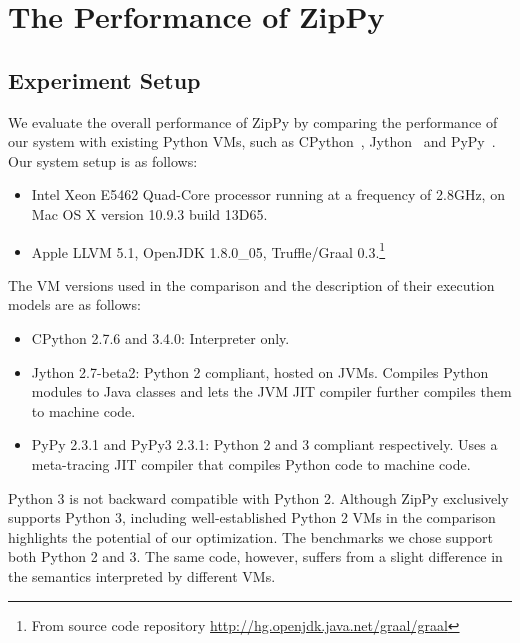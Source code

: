 \section{The Performance of ZipPy}
\label{sec:eval-performance-of-zippy}

\subsection{Experiment Setup}

We evaluate the overall performance of ZipPy by comparing the performance of our system with existing Python VMs, such as CPython~\cite{python}, Jython~\cite{jython} and PyPy~\cite{pypy}.
Our system setup is as follows:

\begin{itemize}

\item Intel Xeon E5462 Quad-Core processor running at a frequency of 2.8GHz, on Mac OS X version 10.9.3 build 13D65.

\item Apple LLVM 5.1, OpenJDK 1.8.0\_05, Truffle/Graal 0.3.\footnote{From source code repository \url{http://hg.openjdk.java.net/graal/graal}}

\end{itemize}

The VM versions used in the comparison and the description of their execution models are as follows:

\begin{itemize}

\item CPython 2.7.6 and 3.4.0: Interpreter only.

\item Jython 2.7-beta2:
Python 2 compliant, hosted on JVMs.
Compiles Python modules to Java classes and lets the JVM JIT compiler further compiles them to machine code.

\item PyPy 2.3.1 and PyPy3 2.3.1: Python 2 and 3 compliant respectively.
Uses a meta-tracing JIT compiler that compiles Python code to machine code.

\end{itemize}

Python 3 is not backward compatible with Python 2.
Although ZipPy exclusively supports Python 3, including well-established Python 2 VMs in the comparison highlights the potential of our optimization.
The benchmarks we chose support both Python 2 and 3.
The same code, however, suffers from a slight difference in the semantics interpreted by different VMs.

